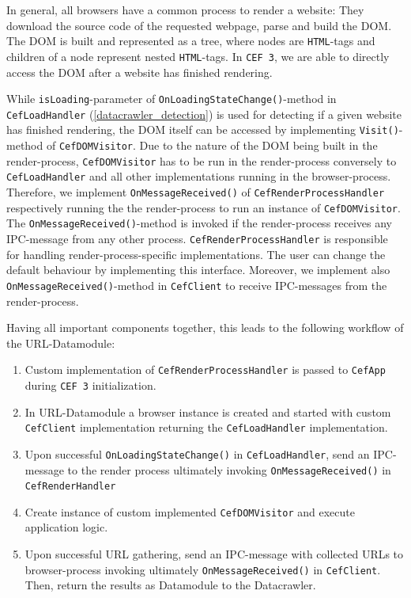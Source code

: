 In general, all browsers have a common process to render a website: They download the source code of the requested webpage, parse and build the DOM. The DOM is built and represented as a tree, where nodes are \texttt{HTML}-tags and children of a node represent nested \texttt{HTML}-tags. In \texttt{CEF 3}, we are able to directly access the DOM after a website has finished rendering. 

While \texttt{isLoading}-parameter of \texttt{OnLoadingStateChange()}-method in \texttt{CefLoadHandler} (\ref{datacrawler_detection}) is used for detecting if a given website has finished rendering, the DOM itself can be accessed by implementing \texttt{Visit()}-method of \texttt{CefDOMVisitor}.
Due to the nature of the DOM being built in the render-process, \texttt{CefDOMVisitor} has to be run in the render-process conversely to \texttt{CefLoadHandler} and all other implementations running in the browser-process. Therefore, we implement \texttt{OnMessageReceived()} of \texttt{CefRenderProcessHandler} respectively running the the render-process to run an instance of \texttt{CefDOMVisitor}. The \texttt{OnMessageReceived()}-method is invoked if the render-process receives any IPC-message from any other process. \texttt{CefRenderProcessHandler} is responsible for handling render-process-specific implementations. The user can change the default behaviour by implementing this interface. Moreover, we implement also \texttt{OnMessageReceived()}-method in \texttt{CefClient} to receive IPC-messages from the render-process.

Having all important components together, this leads to the following workflow of the URL-Datamodule:

\begin{enumerate}
	\item Custom implementation of \texttt{CefRenderProcessHandler} is passed to \texttt{CefApp} during \texttt{CEF 3} initialization.
	\item In URL-Datamodule a browser instance is created and started with custom \texttt{CefClient} implementation returning the \texttt{CefLoadHandler} implementation.
	\item Upon successful \texttt{OnLoadingStateChange()} in \texttt{CefLoadHandler}, send an IPC-message to the render process ultimately invoking \texttt{OnMessageReceived()} in \texttt{CefRenderHandler}
	\item Create instance of custom implemented \texttt{CefDOMVisitor} and execute application logic.
	\label{point_implement_cefdomvisitor}
	\item Upon successful URL gathering, send an IPC-message with collected URLs to browser-process invoking ultimately \texttt{OnMessageReceived()} in \texttt{CefClient}. Then, return the results as Datamodule to the Datacrawler.
\end{enumerate}  

